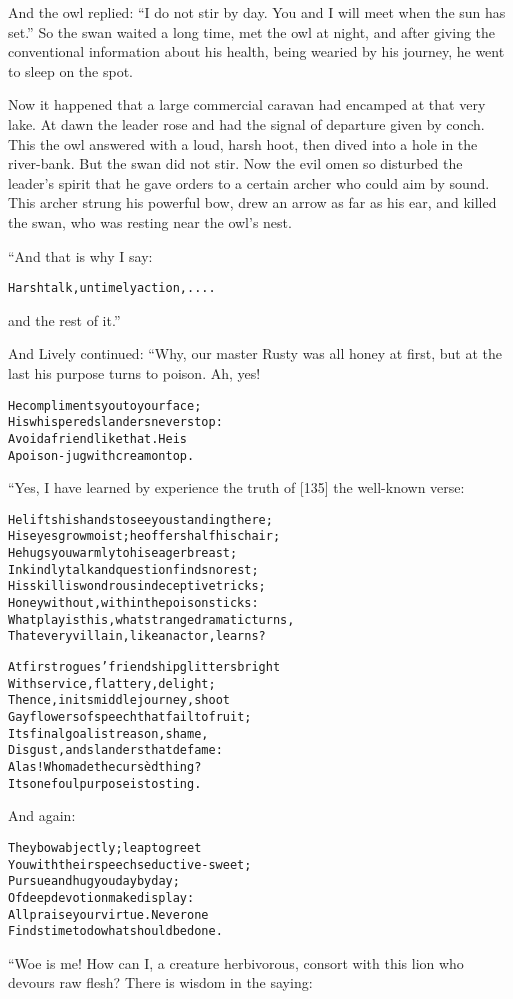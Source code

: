 \documentclass{article}
\renewenvironment{verbatim}{\begin{alltt}\normalfont\begin{centering}}{\end{centering}\end{alltt}}
\begin{document}
And the owl replied:
``I do not stir by day. You and I will meet when the sun has set.''
So the swan waited a long time, met the owl at night, and after
giving the conventional information about his health, being wearied
by his journey, he went to sleep on the spot.

Now it happened that a large commercial caravan had encamped at
that very lake. At dawn the leader rose and had the signal of
departure given by conch. This the owl answered with a loud, harsh
hoot, then dived into a hole in the river-bank. But the swan did
not stir. Now the evil omen so disturbed the leader's spirit that
he gave orders to a certain archer who could aim by sound. This
archer strung his powerful bow, drew an arrow as far as his ear,
and killed the swan, who was resting near the owl's nest.

“And that is why I say:

\begin{verbatim}
Harsh talk, untimely action,. ...
\end{verbatim}
and the rest of it.”

And Lively continued: “Why, our master Rusty was all honey at
first, but at the last his purpose turns to poison. Ah, yes!

\begin{verbatim}
He compliments you to your face;
    His whispered slanders never stop:
Avoid a friend like that. He is
    A poison-jug with cream on top.
\end{verbatim}
“Yes, I have learned by experience the truth of [135] the
well-known verse:

\begin{verbatim}
He lifts his hands to see you standing there;
His eyes grow moist; he offers half his chair;
He hugs you warmly to his eager breast;
In kindly talk and question finds no rest;
His skill is wondrous in deceptive tricks;
Honey without, within the poison sticks:
What play is this, what strange dramatic turns,
That every villain, like an actor, learns?

At first rogues' friendship glitters bright
With service, flattery, delight;
Thence, in its middle journey, shoot
Gay flowers of speech that fail to fruit;
Its final goal is treason, shame,
Disgust, and slanders that defame:
Alas! Who made the cursèd thing?
Its one foul purpose is to sting.
\end{verbatim}
And again:

\begin{verbatim}
They bow abjectly; leap to greet
You with their speech seductive-sweet;
Pursue and hug you day by day;
Of deep devotion make display:
All praise your virtue. Never one
Finds time to do what should be done.
\end{verbatim}
“Woe is me! How can I, a creature herbivorous, consort with this
lion who devours raw flesh? There is wisdom in the saying:
\end{document}
